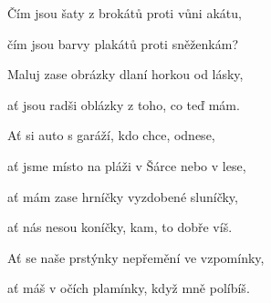 Čím jsou šaty z brokátů proti vůni akátu,

čím jsou barvy plakátů proti sněženkám?

\bigskip

Maluj zase obrázky dlaní horkou od lásky,

ať jsou radši oblázky z toho, co teď mám.
\ks

\zr
Ať si auto s garáží, kdo chce, odnese,

ať jsme místo na pláži v Šárce nebo v lese,

ať mám zase hrníčky vyzdobené sluníčky,

ať nás nesou koníčky, kam, to dobře víš.

\bigskip

Ať se naše prstýnky nepřemění ve vzpomínky,

ať máš v očích plamínky, když mně políbíš.
\kr
\kp
